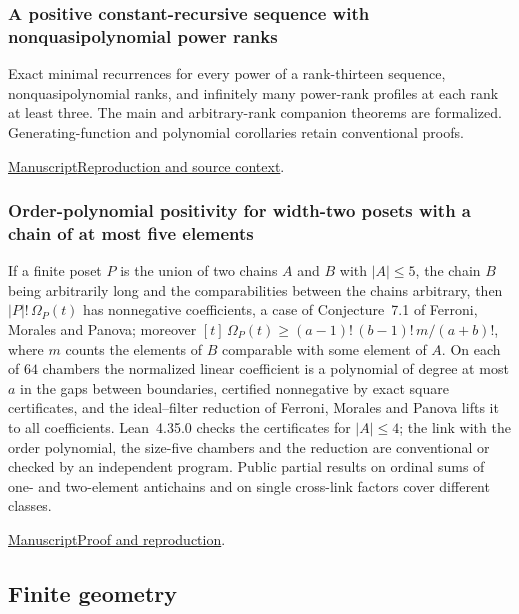 \documentclass[11pt,a4paper]{article}
\begin{document}
\subsubsection{A positive constant-recursive sequence with nonquasipolynomial power ranks}

Exact minimal recurrences for every power of a rank-thirteen sequence, nonquasipolynomial ranks, and infinitely many power-rank profiles at each rank at least three. The main and arbitrary-rank companion theorems are formalized. Generating-function and polynomial corollaries retain conventional proofs.

\href{https://github.com/dvgyl/math-and-theory/blob/main/papers/mathematics/power-rank/manuscript.pdf}{Manuscript}\quad\href{https://github.com/dvgyl/math-and-theory/blob/main/papers/mathematics/power-rank/README.md}{Reproduction and source context}.

\subsubsection{Order-polynomial positivity for width-two posets with a chain of at most five elements}

If a finite poset $P$ is the union of two chains $A$ and $B$ with $|A|\le5$, the chain $B$ being arbitrarily long and the comparabilities between the chains arbitrary, then $|P|!\,\Omega_P(t)$ has nonnegative coefficients, a case of Conjecture~7.1 of Ferroni, Morales and Panova; moreover $[t]\,\Omega_P(t)\ge(a-1)!\,(b-1)!\,m/(a+b)!$, where $m$ counts the elements of $B$ comparable with some element of $A$. On each of $64$ chambers the normalized linear coefficient is a polynomial of degree at most $a$ in the gaps between boundaries, certified nonnegative by exact square certificates, and the ideal--filter reduction of Ferroni, Morales and Panova lifts it to all coefficients. Lean~4.35.0 checks the certificates for $|A|\le4$; the link with the order polynomial, the size-five chambers and the reduction are conventional or checked by an independent program. Public partial results on ordinal sums of one- and two-element antichains and on single cross-link factors cover different classes.

\noindent\href{https://github.com/dvgyl/math-and-theory/blob/main/papers/mathematics/width-two-order-polynomial/manuscript.pdf}{Manuscript}\quad\href{https://github.com/dvgyl/math-and-theory/blob/main/papers/mathematics/width-two-order-polynomial/README.md}{Proof and reproduction}.
\subsection{Finite geometry}
\end{document}
